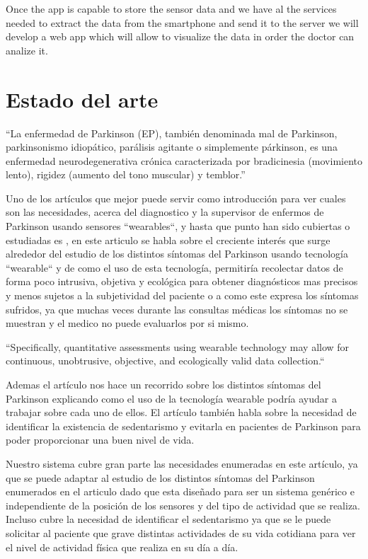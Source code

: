 Once the app is capable to store the sensor data and we have al the services needed to extract the data from the smartphone and send it to the server we will develop a web app which will allow to visualize the data in order the doctor can analize it.
\newpage

\section{Estado del arte}

“La enfermedad de Parkinson (EP), también denominada mal de Parkinson, parkinsonismo idiopático, parálisis agitante o simplemente párkinson, es una enfermedad neurodegenerativa crónica caracterizada por bradicinesia (movimiento lento), rigidez (aumento del tono muscular) y temblor.” \cite{Wikipedia} 
\newline

Uno de los artículos que mejor puede servir como introducción para ver cuales son las necesidades, acerca del diagnostico y la supervisor de enfermos de Parkinson usando sensores ``wearables``, y hasta que punto han sido cubiertas o estudiadas es \cite{resumen2}, en este articulo se habla sobre el creciente interés que surge alrededor del estudio de los distintos síntomas del Parkinson usando tecnología ``wearable`` y de como el uso de esta tecnología, permitiría recolectar datos de forma poco intrusiva, objetiva y ecológica para obtener diagnósticos mas precisos y menos sujetos a la subjetividad del paciente o a como este expresa los síntomas sufridos, ya que muchas veces durante las consultas médicas los síntomas no se muestran y el medico no puede evaluarlos por si mismo.
\newline

``Specifically, quantitative assessments using wearable technology may allow for continuous, unobtrusive, objective, and ecologically valid data collection.``
\newline

Ademas el artículo nos hace un recorrido sobre los distintos síntomas del Parkinson explicando como el uso de la tecnología wearable podría ayudar a trabajar sobre cada uno de ellos. El artículo también habla sobre la necesidad de identificar la existencia de sedentarismo y evitarla en pacientes de Parkinson para poder proporcionar una buen nivel de vida.
\newline

Nuestro sistema cubre gran parte las necesidades enumeradas en este artículo, ya que se puede adaptar al estudio de los distintos síntomas del Parkinson enumerados en el articulo dado que esta diseñado para ser un sistema genérico e independiente de la posición de los sensores y del tipo de actividad que se realiza. Incluso cubre la necesidad de identificar el sedentarismo ya que se le puede solicitar al paciente que grave distintas actividades de su vida cotidiana para ver el nivel de actividad física que realiza en su día a día.
\newline

